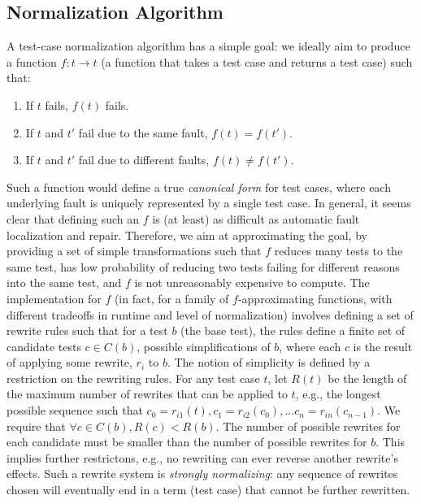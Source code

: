 \subsection{Normalization Algorithm}

A test-case normalization algorithm has a simple goal:  we ideally aim to
produce a function $f : t \rightarrow t$ (a function that takes a test
case and returns a test case) such that:

\begin{enumerate}
\item If $t$ fails, $f(t)$ fails.
\item If $t$ and $t'$ fail due to the same fault, $f(t) = f(t')$.
\item If $t$ and $t'$ fail due to different faults, $f(t) \not=
  f(t')$.
\end{enumerate}

Such a function would define a true \emph{canonical form} for test cases, where
each underlying fault is uniquely represented by a single test case.
In general, it seems clear that defining such an $f$ is (at least) as
difficult as automatic fault localization and repair.  Therefore, we
aim at approximating the goal, by providing a set of simple
transformations such that $f$ reduces many tests to the same test, has
low probability of reducing two tests failing for different reasons
into the same test, and $f$ is not unreasonably expensive to compute.
The implementation for $f$ (in fact, for a family of $f$-approximating
functions, with different tradeoffs in runtime and level of
normalization) involves defining a set of rewrite rules such that for a
test $b$ (the base test), the rules define a finite set of candidate
tests $c \in C(b)$, possible simplifications of $b$, where each $c$ is
the result of applying some rewrite, $r_i$ to $b$.  The notion of
simplicity is defined by a restriction on the rewriting rules.  For
any test case $t$, let $R(t)$ be the length of the maximum number of
rewrites that can be applied to $t$, e.g., the longest possible
sequence such that $c_0 = r_{i1}(t), c_1 = r_{i2}(c_0), ... c_n = r_{in}(c_{n-1})$. We
require that $\forall c \in C(b), R(c) < R(b)$.  The number of possible
rewrites for each candidate must be smaller than the number of
possible rewrites for $b$.  This implies further restrictons, e.g., no
rewriting can ever reverse another rewrite's effects.  Such a rewrite
system is \emph{strongly normalizing}:  any sequence of rewrites
chosen will eventually end in a term (test case) that cannot be
further rewritten.

